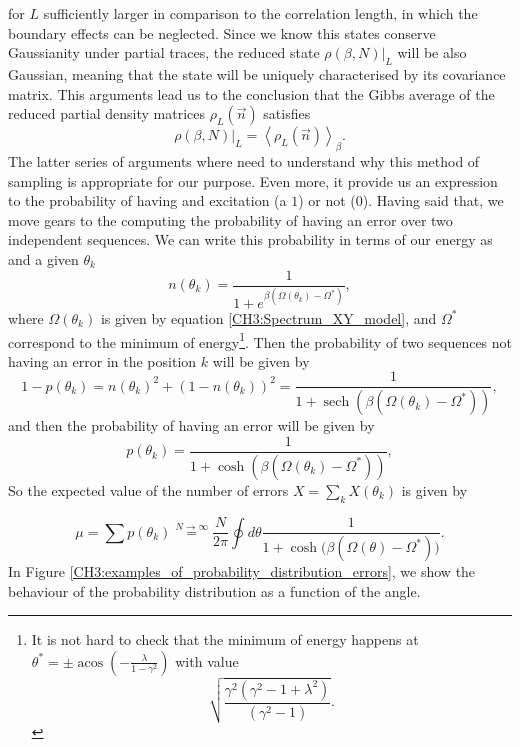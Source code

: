  for $L$ sufficiently larger in comparison to the correlation length, in which the boundary effects can be neglected. Since we know this states conserve Gaussianity under partial traces, the reduced state $\left.\rho(\beta, N)\right|_{L}$ will be also Gaussian, meaning that the state will be uniquely characterised by its covariance matrix. This arguments lead us to the conclusion that the Gibbs average of the reduced partial density matrices $\rho_L(\vec{n})$ satisfies
 \begin{equation}
 \left.\rho(\beta, N)\right|_{L}=\left\langle\rho_{L}(\vec{n})\right\rangle_{\beta}.
 \end{equation}
The latter series of arguments where need to understand why this method of sampling is appropriate for our purpose. Even more, it provide us an expression to the probability of having and excitation (a $1$) or not ($0$). Having said that, we move gears to the computing the probability of having an error over two independent sequences. We can write this probability in terms of our energy as and a given $\theta_k$
\begin{equation}
n(\theta_k)=\frac{1}{1+e^{\beta(\Omega(\theta_k)-\Omega^*)}},
\end{equation}
where $\Omega(\theta_k)$ is given by equation \eqref{CH3:Spectrum_XY_model}, and $\Omega^*$ correspond to the minimum of energy\footnote{It is not hard to check that the minimum of energy happens at $\theta^*=\pm \operatorname{acos}\left(-\frac{\lambda}{1-\gamma^2}\right)$ with value
\[\sqrt{\frac{\gamma^2(\gamma^2-1+\lambda^2)}{(\gamma^2-1)}}.\]}. Then the probability of two sequences not having an error in the position $k$ will be given by
\begin{equation}
1-p(\theta_k) = n(\theta_k)^2 + (1-n(\theta_k))^2 = \frac{1}{1+\operatorname{sech}\left(\beta(\Omega(\theta_k)-\Omega^*)\right)},
\end{equation}
and then the probability of having an error will be given by
\begin{equation}
p(\theta_k) = \frac{1}{1+\cosh\left(\beta(\Omega(\theta_k)-\Omega^*)\right)},
\label{CH3:Probability_of_error_in_site_k}
\end{equation}
So the expected value of the number of errors $X=\sum_{k}X(\theta_k)$ is given by

\begin{equation}
\mu = \sum p(\theta_k) \stackrel{N\to \infty}{=}\frac{N}{2\pi}\oint d\theta \frac{1}{1+\cosh{(\beta(\Omega(\theta)-\Omega^*)})}.
   \label{CH3:average_of_errors}
\end{equation}
In Figure \ref{CH3:examples_of_probability_distribution_errors}, we show the behaviour of the probability distribution as a function of the angle. 


